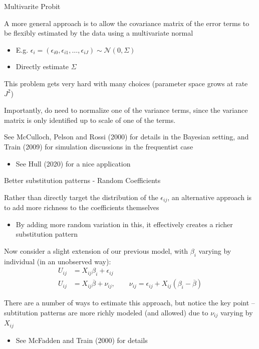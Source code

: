 \documentclass[notes,11pt, aspectratio=169]{beamer}
\newenvironment{wideitemize}{\itemize\addtolength{\itemsep}{10pt}}{\enditemize}
\begin{document}
\begin{frame}{Multivarite Probit}
    \begin{wideitemize}
    \item A more general approach is to allow the covariance matrix of
      the error terms to be flexibly estimated by the data using a multivariate normal
      \begin{itemize}
      \item E.g. $\epsilon_{i} = (\epsilon_{i0},\epsilon_{i1},\ldots, \epsilon_{iJ}) \sim \mathcal{N}(0, \Sigma)$
      \item Directly estimate $\Sigma$
      \end{itemize}
    \item This problem gets very hard with many choices (parameter space grows at rate $J^{2}$)
    \item Importantly, do need to normalize one of the variance terms,
      since the variance matrix is only identified up to scale of one
      of the terms.
    \item See McCulloch, Pelson and Rossi (2000) for details in the
      Bayesian setting, and Train (2009) for simulation discussions in
      the frequentist case
      \begin{itemize}
      \item See Hull (2020) for a nice application
      \end{itemize}
  \end{wideitemize}
\end{frame}


\begin{frame}{Better substitution patterns - Random Coefficients}
  \begin{wideitemize}
  \item Rather than directly target the distribution of the
    $\epsilon_{ij}$, an alternative approach is to add more richness
    to the coefficients themselves
    \begin{itemize}
    \item By adding more random variation in this, it effectively
      creates a richer substitution pattern
    \end{itemize}
  \item Now consider a slight extension of our previous model, with
    $\beta_{i}$ varying by individual (in an unobserved way):
    \begin{align*}
      U_{ij} &= X_{ij}\beta_{i} + \epsilon_{ij}\\
      U_{ij} &= X_{ij}\overline{\beta} + \nu_{ij}, \qquad \nu_{ij} = \epsilon_{ij} + X_{ij}(\beta_{i}-\overline{\beta})
    \end{align*}
  \item There are a number of ways to estimate this approach, but
    notice the key point -- subtitution patterns are more richly
    modeled (and allowed) due to $\nu_{ij}$ varying by $X_{ij}$
    \begin{itemize}
    \item See McFadden and Train (2000) for details
    \end{itemize}
  \end{wideitemize}
\end{frame}
\end{document}
